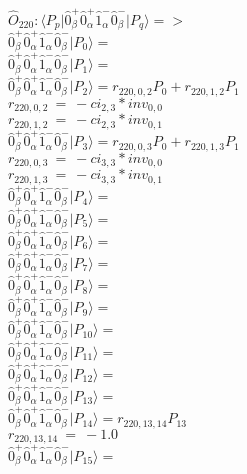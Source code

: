 \documentclass[14pt]{article}
\begin{document}
    $\hat{O}_{220}:  \langle{P_p}\vert \hat{0}_{\beta}^{+}\hat{0}_{\alpha}^{+}\hat{1}_{\alpha}^{-}\hat{0}_{\beta}^{-} \vert{P_q}\rangle => $ \\ 
    $ \hat{0}_{\beta}^{+}\hat{0}_{\alpha}^{+}\hat{1}_{\alpha}^{-}\hat{0}_{\beta}^{-} \vert{P_{0}}\rangle =  $ \\ 
    $ \hat{0}_{\beta}^{+}\hat{0}_{\alpha}^{+}\hat{1}_{\alpha}^{-}\hat{0}_{\beta}^{-} \vert{P_{1}}\rangle =  $ \\ 
    $ \hat{0}_{\beta}^{+}\hat{0}_{\alpha}^{+}\hat{1}_{\alpha}^{-}\hat{0}_{\beta}^{-} \vert{P_{2}}\rangle = {r}_{220,0,2}P_{0}+{r}_{220,1,2}P_{1} $ \\ 
    ${r}_{220,0,2}\ =\ -{ci}_{2,3}*{inv}_{0,0} $ \\ 
    ${r}_{220,1,2}\ =\ -{ci}_{2,3}*{inv}_{0,1} $ \\ 
    $ \hat{0}_{\beta}^{+}\hat{0}_{\alpha}^{+}\hat{1}_{\alpha}^{-}\hat{0}_{\beta}^{-} \vert{P_{3}}\rangle = {r}_{220,0,3}P_{0}+{r}_{220,1,3}P_{1} $ \\ 
    ${r}_{220,0,3}\ =\ -{ci}_{3,3}*{inv}_{0,0} $ \\ 
    ${r}_{220,1,3}\ =\ -{ci}_{3,3}*{inv}_{0,1} $ \\ 
    $ \hat{0}_{\beta}^{+}\hat{0}_{\alpha}^{+}\hat{1}_{\alpha}^{-}\hat{0}_{\beta}^{-} \vert{P_{4}}\rangle =  $ \\ 
    $ \hat{0}_{\beta}^{+}\hat{0}_{\alpha}^{+}\hat{1}_{\alpha}^{-}\hat{0}_{\beta}^{-} \vert{P_{5}}\rangle =  $ \\ 
    $ \hat{0}_{\beta}^{+}\hat{0}_{\alpha}^{+}\hat{1}_{\alpha}^{-}\hat{0}_{\beta}^{-} \vert{P_{6}}\rangle =  $ \\ 
    $ \hat{0}_{\beta}^{+}\hat{0}_{\alpha}^{+}\hat{1}_{\alpha}^{-}\hat{0}_{\beta}^{-} \vert{P_{7}}\rangle =  $ \\ 
    $ \hat{0}_{\beta}^{+}\hat{0}_{\alpha}^{+}\hat{1}_{\alpha}^{-}\hat{0}_{\beta}^{-} \vert{P_{8}}\rangle =  $ \\ 
    $ \hat{0}_{\beta}^{+}\hat{0}_{\alpha}^{+}\hat{1}_{\alpha}^{-}\hat{0}_{\beta}^{-} \vert{P_{9}}\rangle =  $ \\ 
    $ \hat{0}_{\beta}^{+}\hat{0}_{\alpha}^{+}\hat{1}_{\alpha}^{-}\hat{0}_{\beta}^{-} \vert{P_{10}}\rangle =  $ \\ 
    $ \hat{0}_{\beta}^{+}\hat{0}_{\alpha}^{+}\hat{1}_{\alpha}^{-}\hat{0}_{\beta}^{-} \vert{P_{11}}\rangle =  $ \\ 
    $ \hat{0}_{\beta}^{+}\hat{0}_{\alpha}^{+}\hat{1}_{\alpha}^{-}\hat{0}_{\beta}^{-} \vert{P_{12}}\rangle =  $ \\ 
    $ \hat{0}_{\beta}^{+}\hat{0}_{\alpha}^{+}\hat{1}_{\alpha}^{-}\hat{0}_{\beta}^{-} \vert{P_{13}}\rangle =  $ \\ 
    $ \hat{0}_{\beta}^{+}\hat{0}_{\alpha}^{+}\hat{1}_{\alpha}^{-}\hat{0}_{\beta}^{-} \vert{P_{14}}\rangle = {r}_{220,13,14}P_{13} $ \\ 
    ${r}_{220,13,14}\ =\ -1.0 $ \\ 
    $ \hat{0}_{\beta}^{+}\hat{0}_{\alpha}^{+}\hat{1}_{\alpha}^{-}\hat{0}_{\beta}^{-} \vert{P_{15}}\rangle =  $ \\ 
    
\end{document}
